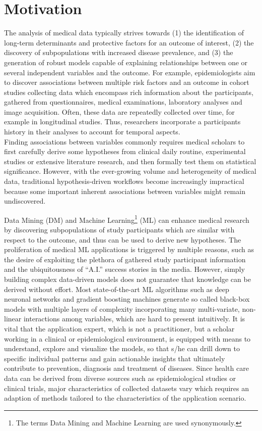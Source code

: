 \documentclass[
]{book}
\begin{document}
\hypertarget{motivation}{%
\section{Motivation}\label{motivation}}

The analysis of medical data typically strives towards (1) the identification of long-term determinants and protective factors for an outcome of interest, (2) the discovery of subpopulations with increased disease prevalence, and (3) the generation of robust models capable of explaining relationships between one or several independent variables and the outcome.
For example, epidemiologists aim to discover associations between multiple risk factors and an outcome in cohort studies collecting data which encompass rich information about the participants, gathered from questionnaires, medical examinations, laboratory analyses and image acquisition.
Often, these data are repeatedly collected over time, for example in longitudinal studies. Thus, researchers incorporate a participants history in their analyses to account for temporal aspects.\\
Finding associations between variables commonly requires medical scholars to first carefully derive some hypotheses from clinical daily routine, experimental studies or extensive literature research, and then formally test them on statistical significance.
However, with the ever-growing volume and heterogeneity of medical data, traditional hypothesis-driven workflows become increasingly impractical because some important inherent associations between variables might remain undiscovered.

Data Mining (DM) and Machine Learning\footnote{The terms Data Mining and Machine Learning are used synonymously.} (ML) can enhance medical research by discovering subpopulations of study participants which are similar with respect to the outcome, and thus can be used to derive new hypotheses.
The proliferation of medical ML applications is triggered by multiple reasons, such as the desire of exploiting the plethora of gathered study participant information and the ubiquitousness of ``A.I.'' success stories in the media.
However, simply building complex data-driven models does not guarantee that knowledge can be derived without effort.
Most state-of-the-art ML algorithms such as deep neuronal networks and gradient boosting machines generate so called black-box models with multiple layers of complexity incorporating many multi-variate, non-linear interactions among variables, which are hard to present intuitively.
It is vital that the application expert, which is not a practitioner, but a scholar working in a clinical or epidemiological environment, is equipped with means to understand, explore and visualize the models, so that s/he can drill down to specific individual patterns and gain actionable insights that ultimately contribute to prevention, diagnosis and treatment of diseases.
Since health care data can be derived from diverse sources such as epidemiological studies or clinical trials, major characteristics of collected datasets vary which requires an adaption of methods tailored to the characteristics of the application scenario.
\end{document}
